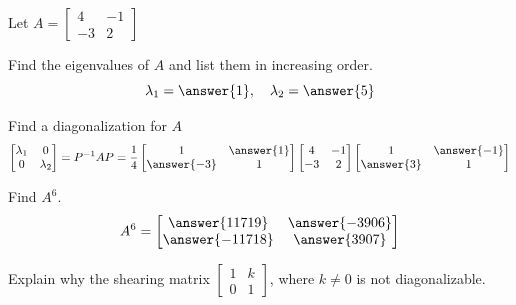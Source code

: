 \documentclass{ximera}
\begin{document}
\begin{problem}\label{prob:diagProb1}
Let $A=\begin{bmatrix}4 & -1\\-3 & 2\end{bmatrix}$
\begin{question}
    Find the eigenvalues of $A$ and list them in increasing order.
    $$\lambda_1=\answer{1},\quad\lambda_2=\answer{5}$$
\end{question}
\begin{question}
    Find a diagonalization for $A$
    $$\begin{bmatrix}\lambda_1 & 0\\0 & \lambda_2\end{bmatrix}=P^{-1}AP=\frac{1}{4}\begin{bmatrix}1 & \answer{1}\\\answer{-3} & 1\end{bmatrix}\begin{bmatrix}4 & -1\\-3 & 2\end{bmatrix}\begin{bmatrix}1 &\answer{-1}\\\answer{3} & 1\end{bmatrix}$$
\end{question}

\begin{question}
    Find $A^6$.
    $$A^6=\begin{bmatrix}\answer{11719} & \answer{-3906}\\\answer{-11718} & \answer{3907}\end{bmatrix}$$
\end{question}
\end{problem}

\begin{problem}\label{prob:notDiagonal}
Explain why the shearing matrix $\begin{bmatrix}1 & k\\0 & 1\end{bmatrix}$, where $k\neq 0$ is not diagonalizable.
\end{problem}
\end{document}
